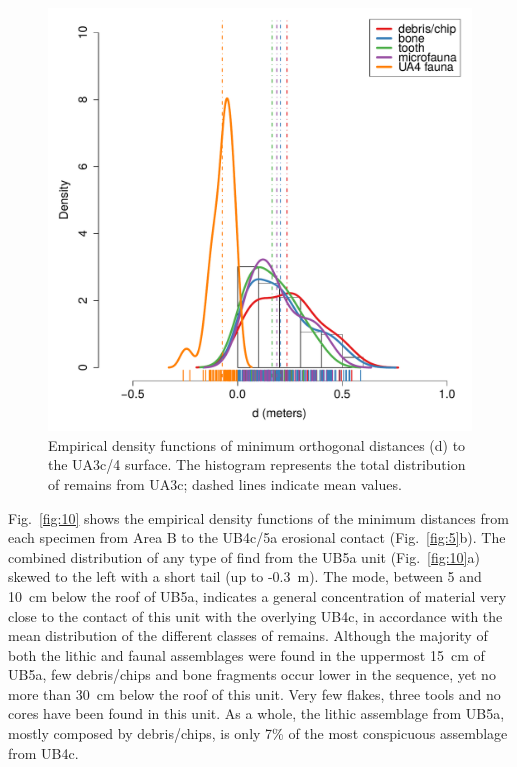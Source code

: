 \documentclass[preprint,authoryear,times]{elsarticle} %
\begin{document}
\begin{figure}[]
  \centering
  \includegraphics[width=1\textwidth]{./artwork/Fig9.pdf}
  \caption{Empirical density functions of minimum orthogonal distances (d) to the UA3c/4 surface. The histogram represents the total distribution of remains from UA3c; dashed lines indicate mean values.}
  \label{fig:9}
\end{figure}


Fig.~\ref{fig:10} shows the empirical density functions of the minimum distances from each specimen from Area B to the UB4c/5a erosional contact (Fig.~\ref{fig:5}b). The combined distribution of any type of find from the UB5a unit (Fig.~\ref{fig:10}a) skewed to the left with a short tail (up to -0.3~m). The mode, between 5 and 10~cm below the roof of UB5a, indicates a general concentration of material very close to the contact of this unit with the overlying UB4c, in accordance with the mean distribution of the different classes of remains. Although the majority of both the lithic and faunal assemblages were found in the uppermost 15~cm of UB5a, few debris/chips and bone fragments occur lower in the sequence, yet no more than 30~cm below the roof of this unit. Very few flakes, three tools and no cores have been found in this unit. As a whole, the lithic assemblage from UB5a, mostly composed by debris/chips, is only 7\% of the most conspicuous assemblage from UB4c.
\end{document}
